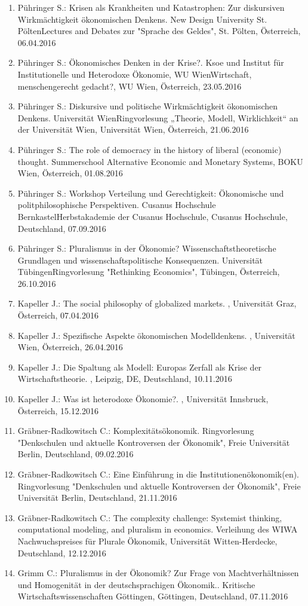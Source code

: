 \begin{enumerate}
	\item Pühringer S.: Krisen als Krankheiten und Katastrophen: Zur diskursiven Wirkmächtigkeit ökonomischen Denkens. New Design University St. PöltenLectures and Debates zur "Sprache des Geldes", St. Pölten, Österreich, 06.04.2016
	\item Pühringer S.: Ökonomisches Denken in der Krise?. Ksoe und Institut für Institutionelle und Heterodoxe Ökonomie, WU WienWirtschaft, menschengerecht gedacht?, WU Wien, Österreich, 23.05.2016
	\item Pühringer S.: Diskursive und politische Wirkmächtigkeit ökonomischen Denkens. Universität WienRingvorlesung „Theorie, Modell, Wirklichkeit“ an der Universität Wien, Universität Wien, Österreich, 21.06.2016
	\item Pühringer S.: The role of democracy in the history of liberal (economic) thought. Summerschool Alternative Economic and Monetary Systems, BOKU Wien, Österreich, 01.08.2016
	\item Pühringer S.: Workshop Verteilung und Gerechtigkeit: Ökonomische und politphilosophische Perspektiven. Cusanus Hochschule BernkastelHerbstakademie der Cusanus Hochschule, Cusanus Hochschule, Deutschland, 07.09.2016
	\item Pühringer S.: Pluralismus in der Ökonomie? Wissenschaftstheoretische Grundlagen und wissenschaftspolitische Konsequenzen. Universität TübingenRingvorlesung "Rethinking Economics", Tübingen, Österreich, 26.10.2016
	\item Kapeller J.: The social philosophy of globalized markets. , Universität Graz, Österreich, 07.04.2016
	\item Kapeller J.: Spezifische Aspekte ökonomischen Modelldenkens. , Universität Wien, Österreich, 26.04.2016
	\item Kapeller J.: Die Spaltung als Modell: Europas Zerfall als Krise der Wirtschaftstheorie. , Leipzig, DE, Deutschland, 10.11.2016
	\item Kapeller J.: Was ist heterodoxe Ökonomie?. , Universität Innsbruck, Österreich, 15.12.2016
	\item Gräbner-Radkowitsch C.: Komplexitätsökonomik. Ringvorlesung "Denkschulen und aktuelle Kontroversen der Ökonomik", Freie Universität Berlin, Deutschland, 09.02.2016
	\item Gräbner-Radkowitsch C.: Eine Einführung in die Institutionenökonomik(en). Ringvorlesung "Denkschulen und aktuelle Kontroversen der Ökonomik", Freie Universität Berlin, Deutschland, 21.11.2016
	\item Gräbner-Radkowitsch C.: The complexity challenge: Systemist thinking, computational modeling, and pluralism in economics. Verleihung des WIWA Nachwuchspreises für Plurale Ökonomik, Universität Witten-Herdecke, Deutschland, 12.12.2016
	\item Grimm C.: Pluralismus in der Ökonomik? Zur Frage von Machtverhältnissen und Homogenität in der deutschsprachigen Ökonomik.. Kritische Wirtschaftswissenschaften Göttingen, Göttingen, Deutschland, 07.11.2016
\end{enumerate}

